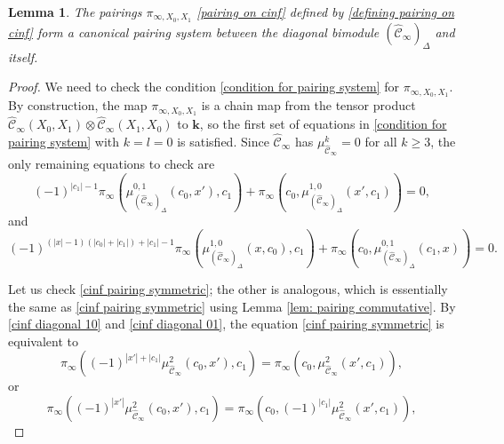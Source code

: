 \documentclass[11pt]{amsproc}
\def\K{{\mathbf{k}}}
\def\cc{\mathcal{C}}
\def\D{\Delta}
\def\cinf{\widehat{\cc}_{\infty}}
\newtheorem{lem}{Lemma}[section]
\theoremstyle{remark}
\numberwithin{equation}{section}
\begin{document}
\begin{lem}\label{lem: cinf canonical pairing system}
The pairings $\pi_{\infty, X_{0}, X_{1}}$ \eqref{pairing on cinf} defined by \eqref{defining pairing on cinf} form a canonical pairing system between the diagonal bimodule $(\cinf)_{\D}$ and itself.
\end{lem}
\begin{proof}
We need to check the condition \eqref{condition for pairing system} for $\pi_{\infty, X_{0}, X_{1}}$.
By construction, the map $\pi_{\infty, X_{0}, X_{1}}$ is a chain map from the tensor product $\cinf(X_{0}, X_{1}) \otimes \cinf(X_{1}, X_{0})$ to $\K$,
so the first set of equations in \eqref{condition for pairing system} with $k=l=0$ is satisfied.
Since $\cinf$ has $\mu^{k}_{\cinf} = 0$ for all $k \ge 3$,
the only remaining equations to check are
\begin{equation}\label{cinf pairing symmetric}
(-1)^{|c_{1}|-1} \pi_{\infty}(\mu^{0, 1}_{(\cinf)_{\D}}(c_{0}, x'), c_{1}) + \pi_{\infty}(c_{0}, \mu^{1, 0}_{(\cinf)_{\D}}(x', c_{1})) = 0,
\end{equation}
and
\begin{equation}\label{cinf pairing symmetric 2}
(-1)^{(|x|-1)(|c_{0}| + |c_{1}|) + |c_{1}| - 1}\pi_{\infty}(\mu^{1, 0}_{(\cinf)_{\D}}(x, c_{0}), c_{1}) + \pi_{\infty}(c_{0}, \mu^{0, 1}_{(\cinf)_{\D}}(c_{1}, x)) = 0.
\end{equation}

Let us check \eqref{cinf pairing symmetric};
 the other is analogous, which is essentially the same as \eqref{cinf pairing symmetric} using Lemma \ref{lem: pairing commutative}.
By \eqref{cinf diagonal 10} and \eqref{cinf diagonal 01},
the equation \eqref{cinf pairing symmetric} is equivalent to
\begin{equation}\label{cinf pairing symmetric 1}
 \pi_{\infty}((-1)^{|x'| + |c_{1}|} \mu^{2}_{\cinf}(c_{0}, x'), c_{1}) =  \pi_{\infty}(c_{0}, \mu^{2}_{\cinf}(x', c_{1})),
\end{equation}
or 
\begin{equation}\label{cinf pairing symmetric 11}
 \pi_{\infty}((-1)^{|x'|} \mu^{2}_{\cinf}(c_{0}, x'), c_{1}) =  \pi_{\infty}(c_{0}, (-1)^{|c_{1}|}\mu^{2}_{\cinf}(x', c_{1})),
\end{equation}


\end{proof}
\end{document}
